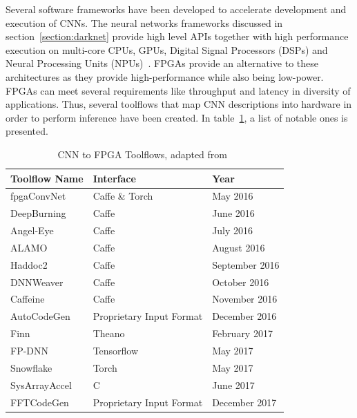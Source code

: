 Several software frameworks have been developed to accelerate development and
execution of CNNs. The neural networks frameworks discussed in
section~\ref{section:darknet} provide high level APIs together with high
performance execution on multi-core CPUs, GPUs, Digital Signal Processors (DSPs)
and Neural Processing Units (NPUs)~\cite{smartphones}. FPGAs provide an
alternative to these architectures as they provide high-performance while also
being low-power. FPGAs can meet several requirements like throughput and latency
in diversity of applications. Thus, several toolflows that map CNN descriptions
into hardware in order to perform inference have been created. In
table~\ref{table:toolflow}, a list of notable ones is presented.
\begin{table}[!htpb]
    \centering
    \begin{tabular}{lll}
    \hline
    \textbf{Toolflow Name} & \textbf{Interface}       & \textbf{Year}  \\ \hline
    fpgaConvNet            & Caffe \& Torch           & May 2016       \\
    DeepBurning            & Caffe                    & June 2016      \\
    Angel-Eye              & Caffe                    & July 2016      \\
    ALAMO                  & Caffe                    & August 2016    \\
    Haddoc2                & Caffe                    & September 2016 \\
    DNNWeaver              & Caffe                    & October 2016   \\
    Caffeine               & Caffe                    & November 2016  \\
    AutoCodeGen            & Proprietary Input Format & December 2016  \\
    Finn                   & Theano                   & February 2017  \\
    FP-DNN                 & Tensorflow               & May 2017       \\
    Snowflake              & Torch                    & May 2017       \\
    SysArrayAccel          & C                        & June 2017      \\
    FFTCodeGen             & Proprietary Input Format & December 2017  \\ \hline
    \end{tabular}
    \label{table:toolflow}
    \caption{CNN to FPGA Toolflows, adapted from~\cite{misc:cnntofpga}}
\end{table}


